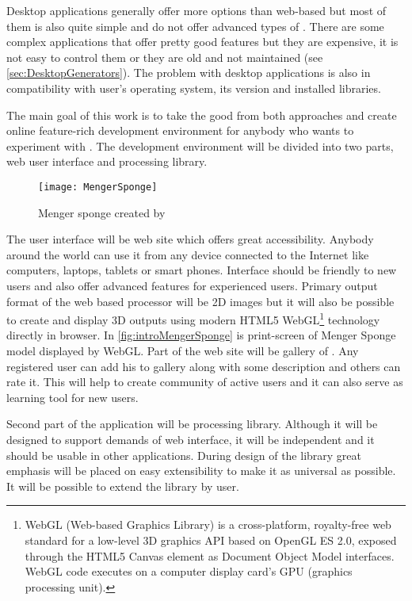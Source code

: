 Desktop applications generally offer more options than web-based but most of them is also quite simple and do not offer advanced types of \lsystems.
There are some complex applications that offer pretty good features but they are expensive, it is not easy to control them or they are old and not maintained (see \autoref{sec:DesktopGenerators}).
The problem with desktop applications is also in compatibility with user's operating system, its version and installed libraries.

The main goal of this work is to take the good from both approaches and create online feature-rich development environment for anybody who wants to experiment with \lsystems.
The development environment will be divided into two parts, web user interface and \lsystem processing library.

\begin{wrapfigure}{r}{0.5\textwidth}%
	\vspace{6pt}%
	\texttt{[image: MengerSponge]}
	\caption{Menger sponge created by \lsystem}
	\label{fig:introMengerSponge}
\end{wrapfigure}

The user interface will be web site which offers great accessibility.
Anybody around the world can use it from any device connected to the Internet like computers, laptops, tablets or smart phones.
Interface should be friendly to new users and also offer advanced features for experienced users.
Primary output format of the web based \lsystem processor will be 2D images but it will also be possible to create and display 3D outputs using modern HTML5 WebGL\footnote{
	WebGL (Web-based Graphics Library) is a cross-platform, royalty-free web standard for a low-level 3D graphics API based on OpenGL ES 2.0, exposed through the HTML5 Canvas element as Document Object Model interfaces.
	WebGL code executes on a computer display card's GPU (graphics processing unit).} technology directly in browser.
In \autoref{fig:introMengerSponge} is print-screen of Menger Sponge model displayed by WebGL.
Part of the web site will be gallery of \lsystems.
Any registered user can add his \lsystems to gallery along with some description and others can rate it.
This will help to create community of active users and it can also serve as learning tool for new users.

Second part of the application will be \lsystem processing library.
Although it will be designed to support demands of web interface, it will be independent and it should be usable in other applications.
During design of the library great emphasis will be placed on easy extensibility to make it as universal as possible.
It will be possible to extend the library by user.

